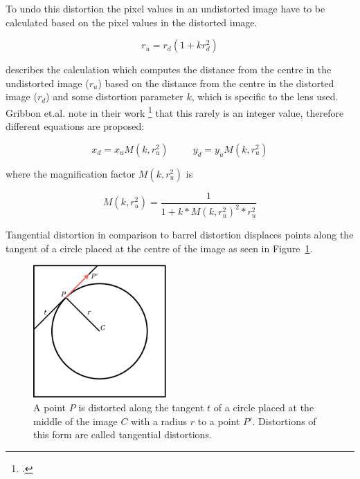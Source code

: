 To undo this distortion the pixel values in an undistorted image have to be calculated based on the pixel values in the distorted image.

\begin{equation}
r_u = r_d(1+k r_d^2)
\end{equation}

describes the calculation which computes the distance from the centre in the undistorted image ($r_u$) based on the distance from the centre in the distorted image ($r_d$) and some distortion parameter $k$, which is specific to the lens used. Gribbon et.al. note in their work \footcite{Gribbon_Barrel_Distortion_Correction_Algorithm} that this rarely is an integer value, therefore different equations are proposed:

\begin{equation}
x_d = x_u M(k,r_u^2) \hspace{30pt} y_d = y_u M(k, r_u^2)
\end{equation}

where the magnification factor $M(k,r_u^2)$ is

\begin{equation}
M(k,r_u^2) = \frac{1}{1+k * M(k,r_u^2)^2 * r_u^2}
\end{equation}

Tangential distortion in comparison to barrel distortion displaces points along the tangent of a circle placed at the centre of the image as seen in Figure~\ref{pic:methodology_stereoCamera_distortion_tangentialDistortion}.

\begin{figure}[h!]
	\centering
	\includegraphics[width=2in]{img/methodology_stereoCamera_distortion_tangentialDistortion.png}
	\caption{A point $P$ is distorted along the tangent $t$ of a circle placed at the middle of the image $C$ with a radius $r$ to a point $P'$. Distortions of this form are called tangential distortions.}
	\label{pic:methodology_stereoCamera_distortion_tangentialDistortion}
\end{figure}

